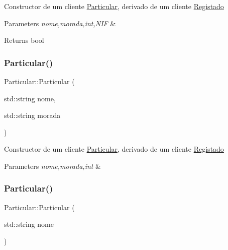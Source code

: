 Constructor de um cliente \hyperlink{class_particular}{Particular}, derivado de um cliente \hyperlink{class_registado}{Registado}


\begin{DoxyParams}{Parameters}
{\em nome,morada,int,N\+IF} & \\
\hline
\end{DoxyParams}
\begin{DoxyReturn}{Returns}
bool 
\end{DoxyReturn}
\mbox{\label{class_particular_a794314799e022e8f05fda84af1722bc8}} 
\subsubsection{\texorpdfstring{Particular()}{Particular()}\hspace{0.1cm}{\footnotesize\ttfamily [2/3]}}
{\footnotesize\ttfamily Particular\+::\+Particular (\begin{DoxyParamCaption}\item[{std\+::string}]{nome,  }\item[{std\+::string}]{morada }\end{DoxyParamCaption})}

Constructor de um cliente \hyperlink{class_particular}{Particular}, derivado de um cliente \hyperlink{class_registado}{Registado}


\begin{DoxyParams}{Parameters}
{\em nome,morada,int} & \\
\hline
\end{DoxyParams}
\mbox{\label{class_particular_a55ebdb7b32d55be44f903be5a4f4d6aa}} 
\subsubsection{\texorpdfstring{Particular()}{Particular()}\hspace{0.1cm}{\footnotesize\ttfamily [3/3]}}
{\footnotesize\ttfamily Particular\+::\+Particular (\begin{DoxyParamCaption}\item[{std\+::string}]{nome }\end{DoxyParamCaption})}

